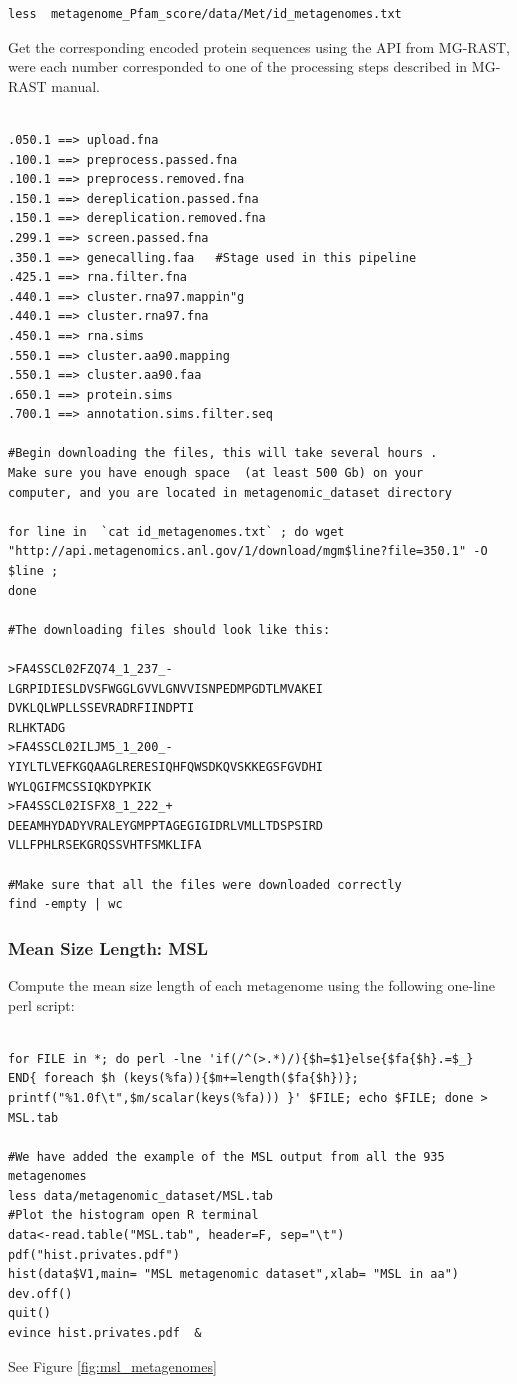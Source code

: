 \documentclass[12pt]{report}
\begin{document}
\begin{verbatim}
less  metagenome_Pfam_score/data/Met/id_metagenomes.txt
\end{verbatim}

Get the corresponding encoded protein sequences using the API from MG-RAST,
were each number corresponded to one of the processing steps described in
MG-RAST manual.



\begin{verbatim}

.050.1 ==> upload.fna                 
.100.1 ==> preprocess.passed.fna      
.100.1 ==> preprocess.removed.fna     
.150.1 ==> dereplication.passed.fna   
.150.1 ==> dereplication.removed.fna  
.299.1 ==> screen.passed.fna          
.350.1 ==> genecalling.faa   #Stage used in this pipeline  
.425.1 ==> rna.filter.fna             
.440.1 ==> cluster.rna97.mappin"g      
.440.1 ==> cluster.rna97.fna          
.450.1 ==> rna.sims                   
.550.1 ==> cluster.aa90.mapping       
.550.1 ==> cluster.aa90.faa           
.650.1 ==> protein.sims               
.700.1 ==> annotation.sims.filter.seq 

#Begin downloading the files, this will take several hours . 
Make sure you have enough space  (at least 500 Gb) on your 
computer, and you are located in metagenomic_dataset directory

for line in  `cat id_metagenomes.txt` ; do wget
"http://api.metagenomics.anl.gov/1/download/mgm$line?file=350.1" -O $line ;
done

#The downloading files should look like this:

>FA4SSCL02FZQ74_1_237_-
LGRPIDIESLDVSFWGGLGVVLGNVVISNPEDMPGDTLMVAKEI
DVKLQLWPLLSSEVRADRFIINDPTI
RLHKTADG
>FA4SSCL02ILJM5_1_200_-
YIYLTLVEFKGQAAGLRERESIQHFQWSDKQVSKKEGSFGVDHI
WYLQGIFMCSSIQKDYPKIK
>FA4SSCL02ISFX8_1_222_+
DEEAMHYDADYVRALEYGMPPTAGEGIGIDRLVMLLTDSPSIRD
VLLFPHLRSEKGRQSSVHTFSMKLIFA

#Make sure that all the files were downloaded correctly 
find -empty | wc
\end{verbatim}

\subsubsection{Mean Size Length: MSL}
\label{msl}
Compute the mean size length of each metagenome  using the following one-line
perl script:

\begin{verbatim}

for FILE in *; do perl -lne 'if(/^(>.*)/){$h=$1}else{$fa{$h}.=$_} 
END{ foreach $h (keys(%fa)){$m+=length($fa{$h})}; 
printf("%1.0f\t",$m/scalar(keys(%fa))) }' $FILE; echo $FILE; done > 
MSL.tab

#We have added the example of the MSL output from all the 935 metagenomes  
less data/metagenomic_dataset/MSL.tab
#Plot the histogram open R terminal 
data<-read.table("MSL.tab", header=F, sep="\t")
pdf("hist.privates.pdf")
hist(data$V1,main= "MSL metagenomic dataset",xlab= "MSL in aa")
dev.off()
quit()
evince hist.privates.pdf  & 
\end{verbatim}
See Figure \ref{fig:msl_metagenomes}
\end{document}
